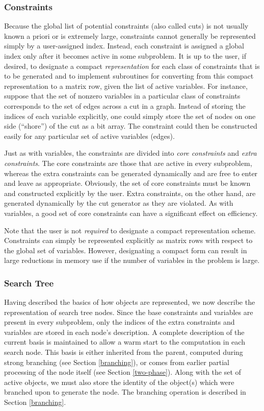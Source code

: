 \subsubsection{Constraints}
\label{constraints}

Because the global list of potential constraints (also called cuts) is
not usually known a priori or is extremely large, constraints cannot
generally be represented simply by a user-assigned index. Instead,
each constraint is assigned a global index only after it becomes
active in some subproblem. It is up to the user, if desired, to
designate a compact {\em representation} for each class of constraints
that is to be generated and to implement subroutines for converting
from this compact representation to a matrix row, given the list of
active variables. For instance, suppose that the set of nonzero
variables in a particular class of constraints corresponds to the set
of edges across a cut in a graph. Instead of storing the indices of
each variable explicitly, one could simply store the set of nodes on
one side (``shore'') of the cut as a bit array. The constraint could
then be constructed easily for any particular set of active variables
(edges).

Just as with variables, the constraints are divided into {\em core
constraints} and {\em extra constraints}. The core constraints are
those that are active in every subproblem, whereas the extra
constraints can be generated dynamically and are free to enter and leave
as appropriate. Obviously, the set of core constraints must be known
and constructed explicitly by the user. Extra constraints, on the
other hand, are generated dynamically by the cut generator as they are
violated. As with variables, a good set of core constraints can have a
significant effect on efficiency.

Note that the user is not {\em required} to designate a compact
representation scheme. Constraints can simply be represented
explicitly as matrix rows with respect to the global set of variables.
However, designating a compact form can result in large reductions in
memory use if the number of variables in the problem is large.

\subsubsection{Search Tree}

Having described the basics of how objects are represented, we now
describe the representation of search tree nodes. Since the base
constraints and variables are present in every subproblem, only the
indices of the extra constraints and variables are stored in each
node's description. A complete description of the current basis is
maintained to allow a warm start to the computation in each search
node. This basis is either inherited from the parent, computed during
strong branching (see Section \ref{branching}), or comes from earlier
partial processing of the node itself (see Section \ref{two-phase}).
Along with the set of active objects, we must also store the identity
of the object(s) which were branched upon to generate the node. The
branching operation is described in Section \ref{branching}.

